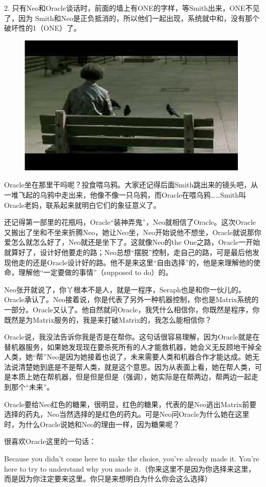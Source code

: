\documentclass[UTF8]{ctexart}
\begin{document}
2. 只有Neo和Oracle谈话时，前面的墙上有ONE的字样，等Smith出来，ONE不见了，因为 Smith和Neo是正负抵消的，所以他们一起出现，系统就中和，没有那个破坏性的1（ONE）了。

\begin{figure}[htb]
\centering
\includegraphics[width=0.5\linewidth]{fig/read_reloaded-65}
\end{figure}

Oracle坐在那里干吗呢？投食喂乌鸦。大家还记得后面Smith跳出来的镜头吧，从一堆飞起的乌鸦中走出来，他像不像一只乌鸦，而Oracle在喂乌鸦……Smith叫Oracle老妈，联系起来就明白它们的象征意义了。

还记得第一部里的花瓶吗，Oracle“装神弄鬼”，Neo就相信了Oracle。这次Oracle又搬出了坐和不坐来折腾Neo，她让Neo坐，Neo开始说他不想坐，Oracle就说那你爱怎么就怎么好了，Neo就还是坐下了。这就像Neo的the One之路，Oracle一开始就算好了，设计好他要走的路；Neo总想“摆脱”控制，走自己的路，可是最后他发现他走的还是Oracle设计好的路。他不是来这里“自由选择”的，他是来理解他的使命，理解他“一定要做的事情”（supposed to do）的。

Neo张开就说了，你丫根本不是人，就是一程序，Seraph也是和你一伙儿的。Oracle承认了。Neo接着说，你是代表了另外一种机器控制，你也是Matrix系统的一部分。Oracle又认了。他自然就问Oracle，我凭什么相信你，你既然是程序，你既然是为Matrix服务的，我是来打破Matrix的，我怎么能相信你？

Oracle说，我没法告诉你我是否是在帮你。这句话很容易理解，因为Oracle就是在替机器服务，如果她发现现在要杀死所有的人才能救机器，她会义无反顾地干掉全人类，她“帮”Neo是因为她接着也说了，未来需要人类和机器合作才能达成。她无法说清楚她到底是不是帮人类，就是这个意思。因为从表面上看，她在帮人类，可是本质上她在帮机器，但是但是但是（强调），她实际是在帮两边，帮两边一起走到那个“未来”。

Oracle要给Neo红色的糖果，很明显，红色的糖果，代表的是Neo逃出Matrix前要选择的药丸，Neo当然选择的是红色的药丸。可是Neo问Oracle为什么她在这里时，为什么Oracle说她和Neo的理由一样，因为糖果呢？

很喜欢Oracle这里的一句话：

Because you didn't come here to make the choice, you've already made it. You're here to try to understand why you made it.（你来这里不是因为你选择来这里，而是因为你注定要来这里。你只是来想明白为什么你会这么选择）
\end{document}
